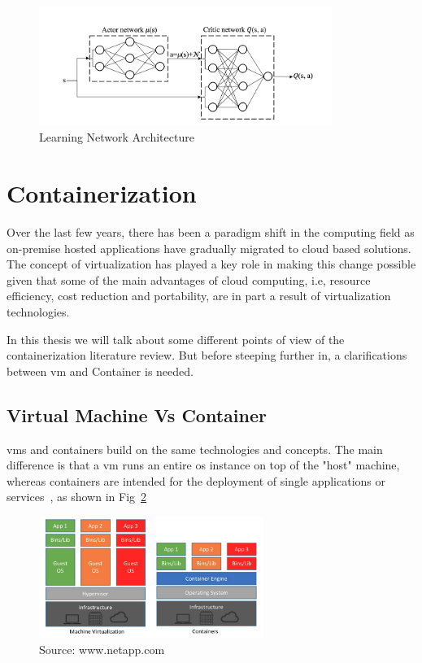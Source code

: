 \begin{figure}[H]
    \centering
    \caption{\label{fig:ddpg} Learning Network Architecture~\cite{practicalDeepLearningStock}}
    \includegraphics[width=0.85\textwidth]{figures/DDPG.png}
\end{figure}

\section{Containerization}

Over the last few years, there has been a paradigm shift in the computing field as on-premise hosted applications have gradually migrated to cloud based solutions. The concept of virtualization has played a key role in making this change possible given that some of the main advantages of cloud computing, i.e, resource efficiency, cost reduction and portability, are in part a result of virtualization technologies.

In this thesis we will talk about some different points of view of the containerization literature review. But before steeping further in, a clarifications between \gls{vm} and Container is needed.

\newpage
\subsection{Virtual Machine Vs Container}

\glspl{vm} and containers build on the same technologies and concepts. The main difference is that a \gls{vm} runs an entire \gls{os} instance on top of the "host" machine, whereas containers are intended for the deployment of single applications or services~\cite{containersStateOfArt}, as shown in Fig~\ref{fig:vm-container}

\begin{figure}[H]
    \centering
    \caption{\label{fig:vm-container} Source: www.netapp.com~\cite{vmVsContainer}}
    \includegraphics[width=0.65\textwidth]{figures/vm & container.png}
\end{figure}


